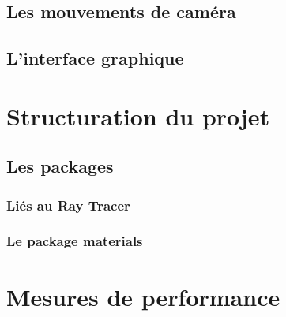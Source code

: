 \documentclass[11pt]{article}
\begin{document}


\subsection{Les mouvements de caméra}
\label{mouvementsCamera}



    \subsection{L'interface graphique}

    

\section{Structuration du projet}
\subsection{Les packages}
\subsubsection{Liés au Ray Tracer}



\subsubsection{Le package materials}



\section{Mesures de performance}


\end{document}
